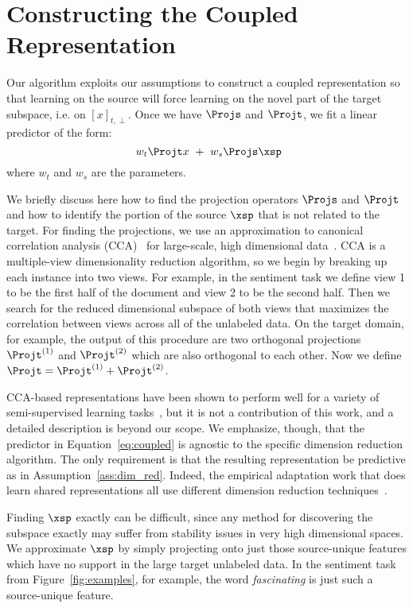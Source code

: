 \section{Constructing the Coupled Representation}
\label{subsec:algorithm}

Our algorithm exploits our assumptions to construct a coupled
representation so that learning on the source will force learning on
the novel part of the target subspace, i.e. on $[x]_{t,\perp}$. Once
we have $\Projs$ and $\Projt$, we fit a linear predictor of the form:
\begin{equation}~\label{eq:coupled}
w_t \Projt x  \ + \  w_s \Projs \xsp
\end{equation}
where $w_t$ and $w_s$ are the parameters.  

We briefly discuss here how to find the projection operators $\Projs$
and $\Projt$ and how to identify the portion of the source $\xsp$ that
is not related to the target.  For finding the projections, we use an
approximation to canonical correlation analysis
(CCA)~\cite{hotelling35} for large-scale, high dimensional
data~\cite{ando07,kakade07,fosterTR}.  CCA is a multiple-view
dimensionality reduction algorithm, so we begin by breaking up each
instance into two views.  For example, in the sentiment task we define
view 1 to be the first half of the document and view 2 to be the
second half.  Then we search for the reduced dimensional subspace of
both views that maximizes the correlation between views across all of
the unlabeled data.  On the target domain, for example, the output of
this procedure are two orthogonal projections $\Projt^{(1)}$ and
$\Projt^{(2)}$ which are also orthogonal to each other.  Now we define
$\Projt = \Projt^{(1)} + \Projt^{(2)}$.

CCA-based representations have been shown to perform well for a
variety of semi-supervised learning
tasks~\cite{ando07,kakade07,fosterTR}, but it is not a contribution of
this work, and a detailed description is beyond our scope.  We
emphasize, though, that the predictor in Equation~\ref{eq:coupled} is
agnostic to the specific dimension reduction algorithm.  The only
requirement is that the resulting representation be predictive as in
Assumption~\ref{ass:dim_red}.  Indeed, the empirical adaptation work
that does learn shared representations all use different dimension
reduction techniques~\cite{blitzer06,guo09,huangyates}.

Finding $\xsp$ exactly can be difficult, since any method for
discovering the subspace exactly may suffer from stability issues in
very high dimensional spaces.  We approximate $\xsp$ by simply
projecting onto just those source-unique features which have no
support in the large target unlabeled data.  In the sentiment task
from Figure~\ref{fig:examples}, for example, the
word \emph{fascinating} is just such a source-unique feature.
